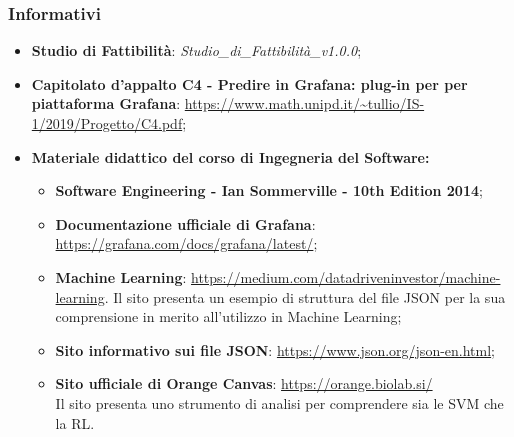 		\subsubsection{Informativi}
			\begin{itemize}
				\item \textbf{Studio di Fattibilità}: \emph{Studio\_di\_Fattibilità\_v1.0.0};
				\item \textbf{Capitolato d'appalto C4 - Predire in Grafana: plug-in per per piattaforma Grafana}: \url{https://www.math.unipd.it/~tullio/IS-1/2019/Progetto/C4.pdf};
				\item \textbf{Materiale didattico del corso di Ingegneria del Software:}
				\begin{itemize}
					\item \textbf{Software Engineering - Ian Sommerville - 10th Edition 2014};
					\item \textbf{Documentazione ufficiale di Grafana}: \url{https://grafana.com/docs/grafana/latest/};
					\item \textbf{Machine Learning}: \href{https://medium.com/datadriveninvestor/machine-learning-how-to-save-and-load-scikit-learn-models-d7b99bc32c27}{https://medium.com/datadriveninvestor/machine-learning}. Il sito presenta un esempio di struttura del file JSON per la sua comprensione in merito all'utilizzo in Machine Learning;
					\item \textbf{Sito informativo sui file JSON}: \url{https://www.json.org/json-en.html};
					\item \textbf{Sito ufficiale di Orange Canvas}: \url{https://orange.biolab.si/} \\ Il sito presenta uno strumento di analisi per comprendere sia le SVM che la RL. 
				\end{itemize}
			\end{itemize}				